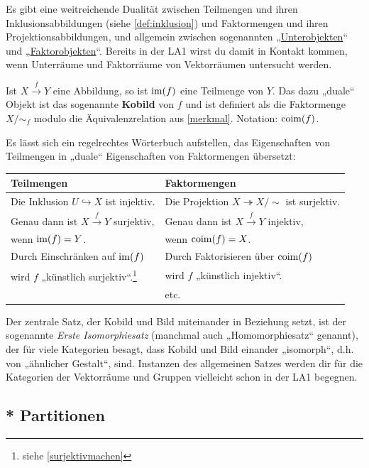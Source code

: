 \begin{vorschau} \label{teilmengenvsfaktormengen} 
    Es gibt eine weitreichende Dualität zwischen Teilmengen und ihren Inklusionsabbildungen (siehe \cref{def:inklusion}) und Faktormengen und ihren Projektionsabbildungen, und allgemein zwischen sogenannten „\href{https://ncatlab.org/nlab/show/subobject}{Unterobjekten}“ und „\href{https://ncatlab.org/nlab/show/quotient+object}{Faktorobjekten}“. Bereits in der LA1 wirst du damit in Kontakt kommen, wenn Unterräume und Faktorräume von Vektorräumen untersucht werden.
    
    Ist $X\xrightarrow{f} Y$ eine Abbildung, so ist $\operatorname{im}(f)$ eine Teilmenge von $Y$. Das dazu „duale“ Objekt ist das sogenannte \textbf{Kobild} von $f$ und ist definiert als die Faktormenge $X/{\sim_f}$ modulo die Äquivalenzrelation aus \cref{merkmal}. Notation: $\operatorname{coim}(f)$.
    
    Es lässt sich ein regelrechtes Wörterbuch aufstellen, das Eigenschaften von Teilmengen in „duale“ Eigenschaften von Faktormengen übersetzt:
    \begin{longtable}{ll}
    Teilmengen & Faktormengen \\
    \midrule
    Die Inklusion $U\hookrightarrow X$ ist injektiv. & Die Projektion $X\twoheadrightarrow X/{\sim}$ ist surjektiv. \\
    Genau dann ist $X\xrightarrow{f} Y$ surjektiv,  & Genau dann ist $X\xrightarrow{f} Y$ injektiv, \\
    \quad wenn $\operatorname{im}(f)=Y$. & \quad wenn $\operatorname{coim}(f)=X$. \\
    Durch Einschränken auf $\operatorname{im}(f)$ & Durch Faktorisieren über $\operatorname{coim}(f)$ \\
    \quad wird $f$ „künstlich surjektiv“.\footnote{siehe \cref{surjektivmachen}} & \quad wird $f$ „künstlich injektiv“. \\
     & \hfill etc. 
    \end{longtable}
    
    \noindent Der zentrale Satz, der Kobild und Bild miteinander in Beziehung setzt, ist der sogenannte \emph{Erste Isomorphiesatz} (manchmal auch „Homomorphiesatz“ genannt), der für viele Kategorien besagt, dass Kobild und Bild einander „isomorph“, d.h. von „ähnlicher Gestalt“, sind. Instanzen des allgemeinen Satzes werden dir für die Kategorien der Vektorräume und Gruppen vielleicht schon in der LA1 begegnen.
\end{vorschau}


\subsection*{* Partitionen}


